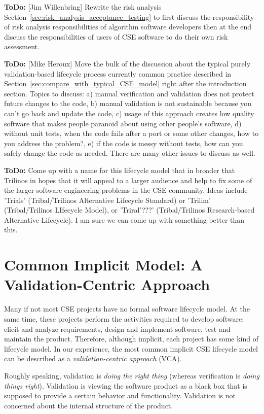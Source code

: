 \documentclass[11pt]{SANDreport}
\begin{document}
{}\textbf{ToDo:} [Jim Willenbring] Rewrite the risk analysis
Section~\ref{sec:risk_analysis_acceptance_testing} to first discuss
the responsibility of risk analysis responsibilities of algorithm
software developers then at the end discuss the responsibilities of
users of CSE software to do their own risk assessment.

{}\textbf{ToDo:} [Mike Heroux] Move the bulk of the discussion about
the typical purely validation-based lifecycle process currently common
practice described in Section~\ref{sec:compare_with_typical_CSE_model}
right after the introduction section.  Topics to discuss: a) manual
verification and validation does not protect future changes to the
code, b) manual validation is not sustainable because you can't go
back and update the code, c) usage of this approach creates low
quality software that makes people paranoid about using other people's
software, d) without unit tests, when the code fails after a port or
some other changes, how to you address the problem?, e) if the code is
messy without tests, how can you safely change the code as needed.
There are many other issues to discuss as well.

{}\textbf{ToDo:} Come up with a name for this lifecycle model that in
broader that Trilinos in hopes that it will appeal to a larger
audience and help to fix some of the larger software engineering
problems in the CSE community.  Ideas include 'Trials'
(Tribal/Trilinos Alternative Lifecycle Standard) or 'Trilim'
(Tribal/Trilinos LIfecycle Model), or 'Triral'???' (Tribal/Trilinos
Research-based Alternative Lifecycle).  I am sure we can come up with
something better than this.

%
{}\section {Common Implicit Model: A Validation-Centric Approach}
\label{sect:validation_centric_approach}

Many if not most CSE projects have no formal software lifecycle model.  At the same time, these projects perform the activities required to develop software: elicit and analyze requirements, design and implement software, test and maintain the product.  Therefore, although implicit, each project has some kind of lifecycle model.  In our experience, the most common implicit CSE lifecycle model can be described as a {\it validation-centric approach} (VCA).  

Roughly speaking, validation is {\it doing the right thing} (whereas verification is {\it doing things right}).  Validation is viewing the software product as a black box that is supposed to provide a certain behavior and functionality.  Validation is not concerned about the internal structure of the product.
\end{document}
